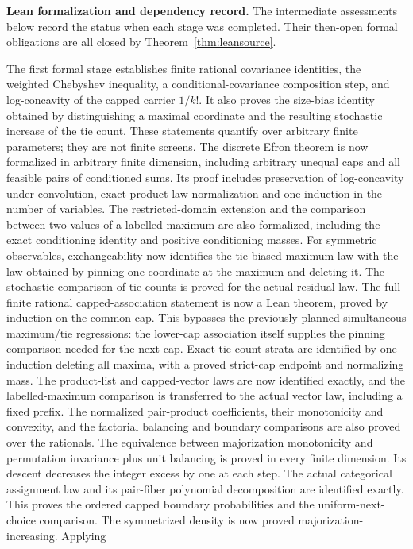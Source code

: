 \documentclass[11pt]{article}
\begin{document}
\medskip\noindent\textbf{Lean formalization and dependency record.}
The intermediate assessments below record the status when each stage was
completed. Their then-open formal obligations are all closed by
Theorem~\ref{thm:leansource}.

The first formal stage establishes finite rational covariance identities,
the weighted Chebyshev inequality, a conditional-covariance composition
step, and log-concavity of the capped carrier $1/k!$. It also proves the
size-bias identity obtained by distinguishing a maximal coordinate and
the resulting stochastic increase of the tie count. These statements
quantify over arbitrary finite parameters; they are not finite screens.
The discrete Efron theorem is now formalized in arbitrary finite
dimension, including arbitrary unequal caps and all feasible pairs of
conditioned sums. Its proof includes preservation of log-concavity under
convolution, exact product-law normalization and one induction in the
number of variables. The restricted-domain extension and the comparison
between two values of a labelled maximum are also formalized, including
the exact conditioning identity and positive conditioning masses.
For symmetric observables, exchangeability now identifies the tie-biased
maximum law with the law obtained by pinning one coordinate at the maximum
and deleting it. The stochastic comparison of tie counts is proved for
the actual residual law.
The full finite rational capped-association statement is now a Lean
theorem, proved by induction on the common cap. This bypasses the
previously planned simultaneous maximum/tie regressions: the lower-cap
association itself supplies the pinning comparison needed for the next cap. Exact tie-count strata are identified by one
induction deleting all maxima, with a proved strict-cap endpoint and
normalizing mass. The product-list and capped-vector laws are now
identified exactly, and the labelled-maximum comparison is transferred
to the actual vector law, including a fixed prefix. The normalized
pair-product coefficients, their monotonicity and convexity, and the
factorial balancing and boundary comparisons are also proved over the
rationals. The equivalence between majorization monotonicity and
permutation invariance plus unit balancing is proved in every finite
dimension. Its descent decreases the integer excess by one at each step.
The actual categorical assignment law and its pair-fiber polynomial
decomposition are identified exactly. This proves the ordered capped
boundary probabilities and the uniform-next-choice comparison. The
symmetrized density is now proved majorization-increasing. Applying
\end{document}
